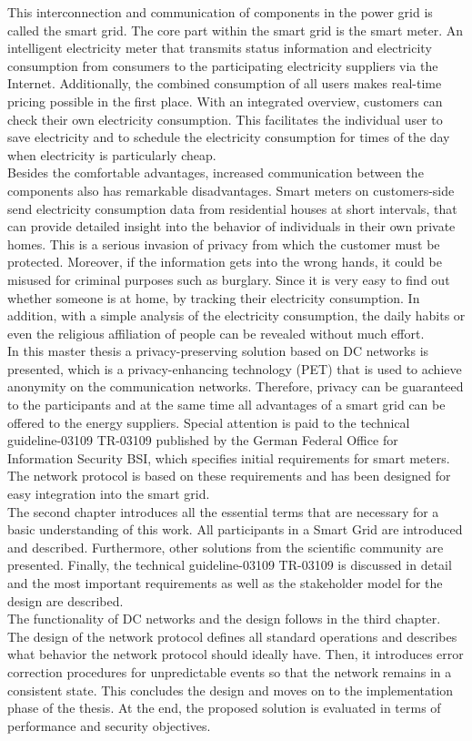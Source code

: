 This interconnection and communication of components in the power grid is called the smart grid. The core part within the smart grid is the smart meter. An intelligent electricity meter that transmits status information and electricity consumption from consumers to the participating electricity suppliers via the Internet. Additionally, the combined consumption of all users makes real-time pricing possible in the first place. With an integrated overview, customers can check their own electricity consumption. This facilitates the individual user to save electricity and to schedule the electricity consumption for times of the day when electricity is particularly cheap.\\ Besides the comfortable advantages, increased communication between the components also has remarkable disadvantages. Smart meters on customers-side send electricity consumption data from residential houses at short intervals, that can provide detailed insight into the behavior of individuals in their own private homes. This is a serious invasion of privacy from which the customer must be protected. Moreover, if the information gets into the wrong hands, it could be misused for criminal purposes such as burglary. Since it is very easy to find out whether someone is at home, by tracking their electricity consumption. In addition, with a simple analysis of the electricity consumption, the daily habits or even the religious affiliation of people can be revealed without much effort.\\ In this master thesis a privacy-preserving solution based on DC networks is presented, which is a privacy-enhancing technology (PET) that is used to achieve anonymity on the communication networks. Therefore, privacy can be guaranteed to the participants and at the same time all advantages of a smart grid can be offered to the energy suppliers. Special attention is paid to the technical guideline-03109 \gls{TR-03109} published by the German Federal Office for Information Security \gls{BSI}, which specifies initial requirements for smart meters. The network protocol is based on these requirements and has been designed for easy integration into the smart grid.\\ The second chapter introduces all the essential terms that are necessary for a basic understanding of this work. All participants in a Smart Grid are introduced and described. Furthermore, other solutions from the scientific community are presented. Finally, the technical guideline-03109 \gls{TR-03109} is discussed in detail and the most important requirements as well as the stakeholder model for the design are described.\\ The functionality of DC networks and the design follows in the third chapter. The design of the network protocol defines all standard operations and describes what behavior the network protocol should ideally have. Then, it introduces error correction procedures for unpredictable events so that the network remains in a consistent state. This concludes the design and moves on to the implementation phase of the thesis. At the end, the proposed solution is evaluated in terms of performance and security objectives.\\

